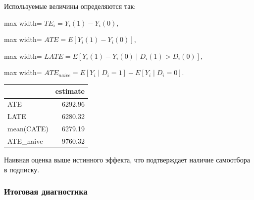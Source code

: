\documentclass[11pt]{article}
\newcounter{none}
\begin{document}
Используемые величины определяются так:

\begin{center}
\begin{adjustbox}{max width=\linewidth}
\(\displaystyle TE_i = Y_i(1) - Y_i(0),\)
\end{adjustbox}
\end{center}

\begin{center}
\begin{adjustbox}{max width=\linewidth}
\(\displaystyle ATE = E[Y_i(1) - Y_i(0)],\)
\end{adjustbox}
\end{center}

\begin{center}
\begin{adjustbox}{max width=\linewidth}
\(\displaystyle LATE = E[Y_i(1) - Y_i(0) \mid D_i(1) > D_i(0)],\)
\end{adjustbox}
\end{center}

\begin{center}
\begin{adjustbox}{max width=\linewidth}
\(\displaystyle ATE_{naive} = E[Y_i \mid D_i=1] - E[Y_i \mid D_i=0].\)
\end{adjustbox}
\end{center}

{\def\LTcaptype{none} %
\begin{longtable}[]{@{}lr@{}}
\toprule\noalign{}
& estimate \\
\midrule\noalign{}
\endhead
\bottomrule\noalign{}
\endlastfoot
ATE & 6292.96 \\
LATE & 6280.32 \\
mean(CATE) & 6279.19 \\
ATE\_naive & 9760.32 \\
\end{longtable}
}

Наивная оценка выше истинного эффекта, что подтверждает наличие
самоотбора в подписку.

\subsubsection{Итоговая
диагностика}\label{ux438ux442ux43eux433ux43eux432ux430ux44f-ux434ux438ux430ux433ux43dux43eux441ux442ux438ux43aux430}
\end{document}
